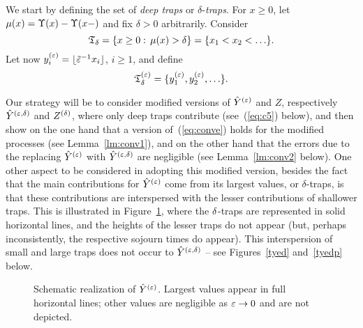 We start by defining the set of {\em deep traps} or $\delta$-{\em traps}. 
For $x\geq0$, let $\mu(x)=\Upsilon(x)-\Upsilon(x-)$ and fix $\delta>0$ arbitrarily. Consider
\begin{equation}
\label{eq:taudelta}
\t_{\delta}=\{x\geq0:\, \mu(x)>\delta\}=\{x_1<x_2<\ldots\}.
\end{equation}
Let now $y^{(\varepsilon)}_i=\lfloor\tilde{\varepsilon}^{-1}x_i\rfloor$, $i\geq1$, and define
\begin{equation}
\label{eq:tauedelta}
\teps_{\delta}=\{\yep_1,\yep_2,\ldots\}.
\end{equation}


Our strategy will be to consider modified versions of $\hat Y^{(\varepsilon)}$ and $Z$,
respectively $\hat Y^{(\varepsilon,\delta)}$ and $Z^{(\delta)}$, where only deep traps contribute
(see~(\ref{eq:c5}) below), and then show on the one hand that a version of~(\ref{eq:conve})
holds for the modified processes (see Lemma~\ref{lm:conv1}), and on the other hand that 
the errors due to the replacing $\hat Y^{(\varepsilon)}$ with $\hat Y^{(\varepsilon,\delta)}$ 
are negligible (see Lemma~\ref{lm:conv2} below).
One other aspect to be considered in adopting this modified version, besides the fact that the 
main contributions for $\hat Y^{(\varepsilon)}$ come from its largest values, or $\delta$-traps, 
is that these contributions are interspersed with the lesser contributions of shallower traps. 
This is illustrated in Figure~\ref{yte}, where the $\delta$-traps 
are represented in solid horizontal lines, and the heights of the lesser traps do not appear (but, 
perhaps inconsistently, the respective sojourn times do appear). This interspersion of small 
and large traps does not occur to $\hat Y^{(\varepsilon,\delta)}$ -- see Figures~\ref{tyed} and~\ref{tyedp}
below.




\begin{figure}[htb]
\begin{center}

\end{center}
\caption{Schematic realization of $\hat Y^{(\varepsilon)}$. Largest values appear in full horizontal lines; other values are negligible as $\varepsilon\to0$
and are not depicted.}
\label{yte}
\end{figure}





